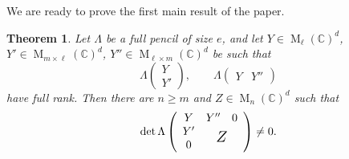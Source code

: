 \documentclass[12pt,a4paper]{amsart}
\DeclareMathOperator{\opm}{M}
\newcommand{\C}{\mathbb{C}}
\newcommand*{\mathlarger}[1]{\scalebox{1.35}{$#1$}}
\newcommand*{\mat}[1]{\opm_{#1}(\C)}
\newtheorem{thm}{Theorem}[section]
\theoremstyle{definition}
\theoremstyle{remark}
\numberwithin{equation}{section}
\begin{document}
We are ready to prove the first main result of the paper.

\begin{thm}\label{t:nonherm}
Let $\Lambda$ be a full pencil of size $e$, and let $Y\in\mat{\ell}^d$, $Y'\in\mat{m\times \ell}^d$, $Y''\in\mat{\ell\times m}^d$ be such that
\begin{equation}\label{e:rk}
\Lambda \begin{pmatrix} Y \\ Y'\end{pmatrix},\qquad
\Lambda \begin{pmatrix} Y & Y''\end{pmatrix}
\end{equation}
have full rank. Then there are $n\ge m$ and $Z\in\mat{n}^d$
such that
$$
\det \Lambda 
\left(\begin{array}{cc}
Y & \begin{matrix} Y'' & 0\end{matrix} \\
\begin{matrix} Y' \\ 0\end{matrix} & \mathlarger{Z}
\end{array}\right)
\neq0.
$$
\end{thm}
\end{document}
